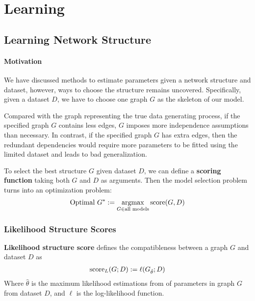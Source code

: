 \documentclass[11pt]{article}
\begin{document}
	\section{Learning}
	\subsection{Learning Network Structure}
	\paragraph{Motivation} We have discussed methods to estimate parameters given a network structure and dataset, however, ways to choose the structure remains uncovered.
	Specifically, given a dataset $D$, we have to choose one graph $G$ as the skeleton of our model.

	 Compared with the graph representing the true data generating process, if the specified graph $G$ contains less edges, $G$ imposes more independence assumptions than necessary.
	 In contrast, if the specified graph $G$ has extra edges, then the redundant dependencies would require more parameters to be fitted using the limited dataset and leads to bad generalization.
	
	To select the best structure $G$ given dataset $D$, we can define a \textbf{scoring function} taking both $G$ and $D$ as arguments.
	Then the model selection problem turns into an optimization problem:
	\begin{align}
		\text{{Optimal }} G^* := \operatorname*{argmax}_{G \in \text{{all models}}} \text{{score}}(G, D)
	\end{align}

	\subsubsection{Likelihood Structure Scores}
	\begin{definition}
		\textbf{Likelihood structure score} defines the compatibleness between a graph $G$ and dataset $D$ as
		\begin{align}
			\text{{score}}_L (G; D) := \ell(G_{\hat{\theta}}; D)
		\end{align}
		Where $\hat{\theta}$ is the maximum likelihood estimations from of parameters in graph $G$ from dataset $D$, and $\ell$ is the log-likelihood function.
	\end{definition}
\end{document}
